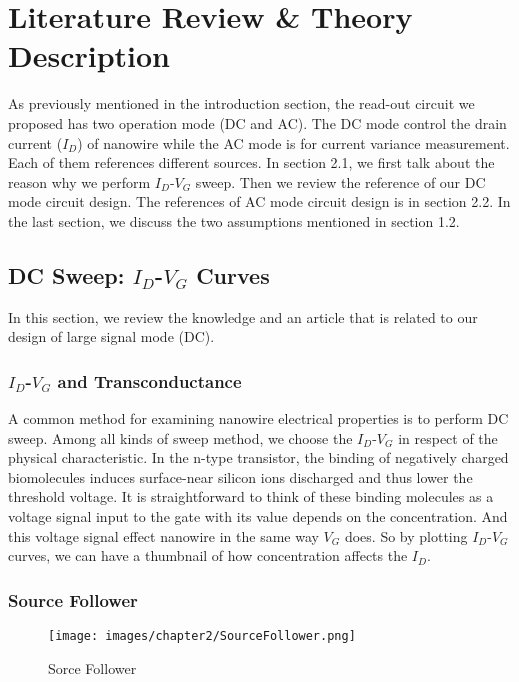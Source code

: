 \chapter{Literature Review \& Theory Description}
As previously mentioned in the introduction section, the read-out circuit we proposed has two operation mode (DC and AC).
The DC mode control the drain current ($I_D$) of nanowire while the AC mode is for current variance measurement.
Each of them references different sources.
In section 2.1, we first talk about the reason why we perform $I_D$-$V_G$ sweep.
Then we review the reference of our DC mode circuit design.
The references of AC mode circuit design is in section 2.2.
In the last section, we discuss the two assumptions mentioned in section 1.2.

\section{DC Sweep: $I_D$-$V_G$ Curves}
In this section, we review the knowledge and an article that is related to our design of large signal mode (DC).

\subsection{$I_D$-$V_G$ and Transconductance}
A common method for examining nanowire electrical properties is to perform DC sweep.
Among all kinds of sweep method, we choose the $I_D$-$V_G$ in respect of the physical characteristic.
In the n-type transistor, the binding of negatively charged biomolecules induces surface-near silicon ions discharged and thus lower the threshold voltage.
It is straightforward to think of these binding molecules as a voltage signal input to the gate with its value depends on the concentration.
And this voltage signal effect nanowire in the same way $V_G$ does.
So by plotting $I_D$-$V_{G}$  curves, we can have a thumbnail of how concentration affects the $I_D$.


\subsection{Source Follower} \label{section:SF}

\begin{figure}[h]
    \centering
    \texttt{[image: images/chapter2/SourceFollower.png]}
    \fontsize{6}{7}\selectfont
    \caption{Sorce Follower}
    \label{fig:SF}
\end{figure}

